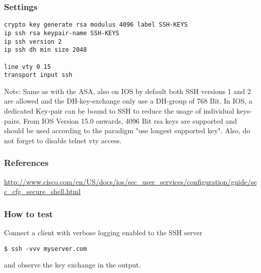 \subsubsection{Settings}
\begin{lstlisting}
crypto key generate rsa modulus 4096 label SSH-KEYS
ip ssh rsa keypair-name SSH-KEYS
ip ssh version 2
ip ssh dh min size 2048

line vty 0 15
transport input ssh
\end{lstlisting}
Note: Same as with the ASA, also on IOS by default both SSH versions 1 and 2 are allowed and the DH-key-exchange only use a DH-group of 768 Bit.
In IOS, a dedicated Key-pair can be bound to SSH to reduce the usage of individual keys-pairs.
From IOS Version 15.0 onwards, 4096 Bit rsa keys are supported and should be used according to the paradigm "use longest supported key". Also, do not forget to disable telnet vty access.


\subsubsection{References}
\begin{itemize*}
  \item \url{http://www.cisco.com/en/US/docs/ios/sec\_user\_services/configuration/guide/sec\_cfg\_secure\_shell.html}
\end{itemize*}

\subsubsection{How to test}
Connect a client with verbose logging enabled to the SSH server
\begin{lstlisting}
$ ssh -vvv myserver.com
\end{lstlisting}and observe the key exchange in the output.
